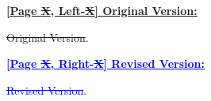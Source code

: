 \begin{tcolorbox}[colframe=black,colback=white,arc=0mm,boxrule=0.5mm, left=1mm, right=1mm, top=1mm, bottom=1mm, use color stack,breakable]

  \noindent \textbf{\underline{[Page \sout{X}, Left-\sout{X}] Original Version:}}

  \vspace{1mm}

  \noindent
  \sout{Original Version}.

  \hrulefill
  \vspace{1mm}

  \noindent \textbf{\textcolor{blue}{\underline{[Page \sout{X}, Right-\sout{X}] Revised Version:}}}

  \vspace{1mm}

  \noindent
  \textcolor{blue}{
    \sout{Revised Version}.
  }

\end{tcolorbox}

\clearpage
